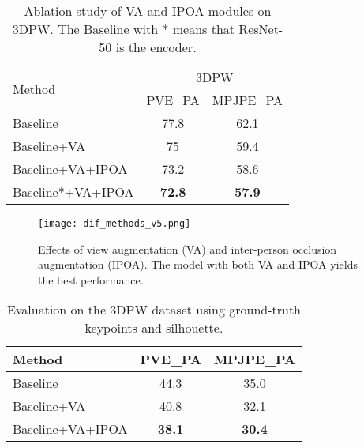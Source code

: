 \documentclass[journal]{IEEEtran}
\begin{document}
\begin{table}[!htbp]
\caption{Ablation study of VA and IPOA modules on 3DPW. The Baseline with * means that ResNet-50 is the encoder.}
\begin{center}

\begin{tabular}{@{}lcc@{}}
\toprule
\multirow{2}{*}{Method}         & \multicolumn{2}{c}{3DPW} \\
                                & PVE\_PA    & MPJPE\_PA   \\ \midrule
Baseline                        & 77.8       & 62.1        \\
Baseline+VA               & 75         & 59.4        \\
Baseline+VA+IPOA & 73.2       & 58.6       \\ 
Baseline*+VA+IPOA & \textbf{72.8}       & \textbf{57.9}        \\ \bottomrule
\end{tabular}
\label{3dpw}
\end{center}
\end{table}
\vspace{-0.2cm}

\begin{figure}
    
    \centerline{\texttt{[image: dif\_methods\_v5.png]}}
\caption{Effects of view augmentation (VA) and inter-person occlusion augmentation (IPOA). The model with both VA and IPOA yields the best performance.}
    \label{fig:dif_methods}
\end{figure}






\begin{table}[!htbp]
\vspace{-0.2cm}
\caption{ Evaluation on the 3DPW dataset using ground-truth keypoints and silhouette.}
\begin{center}
\begin{tabular}{lcc}
\hline
Method                          & PVE\_PA       & MPJPE\_PA     \\ \hline
Baseline                        & 44.3          & 35.0          \\
Baseline+VA                & 40.8          & 32.1          \\
Baseline+VA+IPOA & \textbf{38.1} & \textbf{30.4} \\ \hline
\end{tabular}
\label{tab:groundtruth}
\end{center}
\end{table}
\vspace{-0.2cm}
\end{document}
